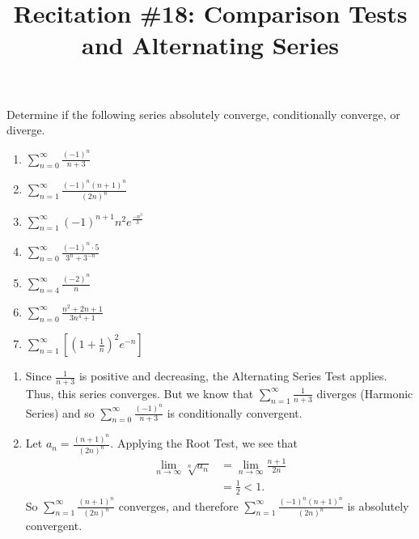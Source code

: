 \documentclass[handout]{ximera}
\title{Recitation \#18: Comparison Tests and Alternating Series}
\begin{document}
\begin{abstract}		\end{abstract}
\maketitle




\begin{problem}
Determine if the following series absolutely converge, conditionally converge, or diverge.
	\begin{enumerate}
	
	\item  $\sum_{n=0}^\infty \frac{(-1)^n}{n+3}$
	
	\item  $\sum_{n=1}^\infty \frac{(-1)^n (n+1)^n}{(2n)^n}$
	
	\item  $\sum_{n=1}^\infty (-1)^{n+1} n^2 e^{\frac{-n^3}{3}}$
	
	\item  $\sum_{n=0}^\infty \frac{(-1)^n \cdot 5}{3^n + 3^{-n}}$
	
	\item  $\sum_{n=4}^\infty \frac{(-2)^n}{n}$
	
	\item  $\sum_{n=0}^\infty \frac{n^2+2n+1}{3n^4+1}$
	
	\item  $\sum_{n=1}^\infty \left[ \left( 1+\frac{1}{n} \right)^2 e^{-n} \right]$
	
	\end{enumerate}
	
	\begin{freeResponse}
	
	\begin{enumerate}
	
	\item  Since $\frac{1}{n+3}$ is positive and decreasing, the Alternating Series Test applies.  
	Thus, this series converges.  
	But we know that $\sum_{n=1}^\infty \frac{1}{n+3}$ diverges (Harmonic Series) and so $\sum_{n=0}^\infty \frac{(-1)^n}{n+3}$ is {\color{red}conditionally convergent}.
	
	\item  Let $a_n = \frac{(n+1)^n}{(2n)^n}$.  
	Applying the Root Test, we see that
		\begin{align*}
		\lim_{n \to \infty} \sqrt[n]{a_n} &= \lim_{n \to \infty} \frac{n+1}{2n}  \\
		&= \frac{1}{2} < 1.
		\end{align*}
	So $\sum_{n=1}^\infty \frac{(n+1)^n}{(2n)^n}$ converges, and therefore $\sum_{n=1}^\infty \frac{(-1)^n (n+1)^n}{(2n)^n}$ is {\color{red}absolutely convergent}.
	

\end{enumerate}
\end{freeResponse}
\end{problem}
\end{document}
